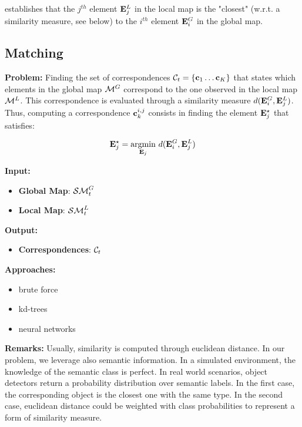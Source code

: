 \documentclass{article}
\begin{document}
	\noindent
	establishes that the $j^{th}$ element $\mathbf{E}_j^L$ in the local map is the "closest" (w.r.t. a similarity measure, see below) to the $i^{th}$ element $\mathbf{E}_i^G$ in the global map.
	
	\subsection{Matching} 
	
	{\bf Problem: }	Finding the set of correspondences $\mathcal{C}_t = \{\mathbf{c}_1 \dots \mathbf{c}_K\}$ that states which elements in the global map $\mathcal{M}^G$ correspond to the one observed in the local map $\mathcal{M}^L$. This correspondence is evaluated through a similarity measure $d(\mathbf{E}_i^G,\mathbf{E}_j^L)$. Thus, computing a correspondence $\mathbf{c}^{i,j}_k$ consists in finding the element $\mathbf{E}_j^\star$ that satisfies:
	
	\begin{equation}
		\mathbf{E}_j^\star = \operatorname*{argmin}_{\mathbf{E}_j} \, d(\mathbf{E}_i^G,\mathbf{E}_j^L)
	\end{equation}
		
	\noindent
	{\bf Input: }
	\begin{itemize}
		\item {\bf Global Map}: $\mathcal{SM}^G_t$
		\item {\bf Local Map}: $\mathcal{SM}^L_t$
	\end{itemize}
	\noindent
	{\bf Output: }
	\begin{itemize}
		\item {\bf Correspondences}: $\mathcal{C}_t$		
	\end{itemize}
	\noindent
	{\bf Approaches: }
	\begin{itemize}
		\item brute force
		\item kd-trees
		\item neural networks
	\end{itemize}
	\noindent
	{\bf Remarks: }
	Usually, similarity is computed through euclidean distance. In our problem, we leverage also semantic information. In a simulated environment, the knowledge of the semantic class is perfect. In real world scenarios, object detectors return a probability distribution over semantic labels. In the first case, the corresponding object is the closest one with the same type. In the second case, euclidean distance could be weighted with class probabilities to represent a form of similarity measure.
		
\end{document}
